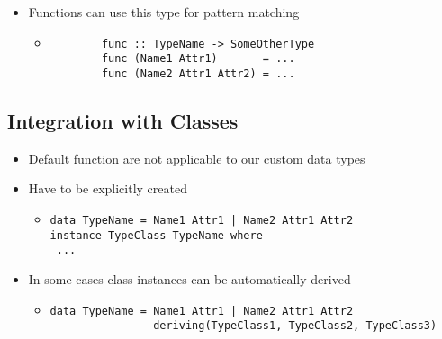 \begin{itemize}
\begin{itemize}
            \item Functions can use this type for pattern matching
                \begin{itemize}
                    \item
        \begin{verbatim}
        func :: TypeName -> SomeOtherType
        func (Name1 Attr1)       = ...
        func (Name2 Attr1 Attr2) = ...
        \end{verbatim}
                \end{itemize}
        \end{itemize}
\end{itemize}

\subsection{Integration with Classes}
\begin{itemize}
    \item Default function are not applicable to our custom data types
    \item Have to be explicitly created
        \begin{itemize}
            \item
\begin{verbatim}
data TypeName = Name1 Attr1 | Name2 Attr1 Attr2
instance TypeClass TypeName where
 ...
\end{verbatim}
        \end{itemize}
    \item In some cases class instances can be automatically derived
        \begin{itemize}
            \item 
\begin{verbatim}
data TypeName = Name1 Attr1 | Name2 Attr1 Attr2
                deriving(TypeClass1, TypeClass2, TypeClass3)
\end{verbatim}
        \end{itemize}
\end{itemize}

